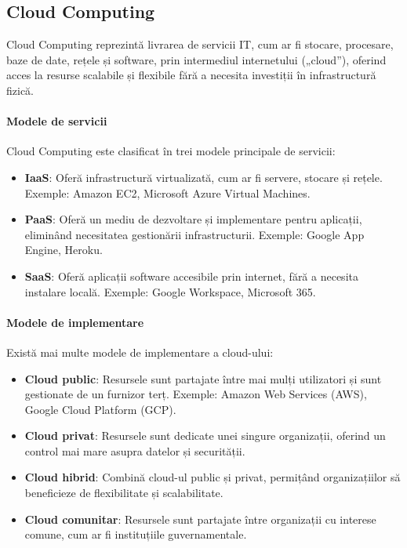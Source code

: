 \documentclass[titlepage,12pt]{article}
\begin{document}
\subsection{Cloud Computing}

Cloud Computing reprezintă livrarea de servicii IT, cum ar fi stocare, procesare, baze de date, rețele și software, prin intermediul internetului („cloud”), oferind acces la resurse scalabile și flexibile fără a necesita investiții în infrastructură fizică.

\paragraph{Modele de servicii}
Cloud Computing este clasificat în trei modele principale de servicii:
\begin{itemize}
    \item \textbf{\ac {IaaS}}: Oferă infrastructură virtualizată, cum ar fi servere, stocare și rețele. Exemple: Amazon EC2, Microsoft Azure Virtual Machines.
    \item \textbf{\ac {PaaS}}: Oferă un mediu de dezvoltare și implementare pentru aplicații, eliminând necesitatea gestionării infrastructurii. Exemple: Google App Engine, Heroku.
    \item \textbf{\ac {SaaS}}: Oferă aplicații software accesibile prin internet, fără a necesita instalare locală. Exemple: Google Workspace, Microsoft 365.
\end{itemize}

\paragraph{Modele de implementare}
Există mai multe modele de implementare a cloud-ului:
\begin{itemize}
    \item \textbf{Cloud public}: Resursele sunt partajate între mai mulți utilizatori și sunt gestionate de un furnizor terț. Exemple: Amazon Web Services (AWS), Google Cloud Platform (GCP).
    \item \textbf{Cloud privat}: Resursele sunt dedicate unei singure organizații, oferind un control mai mare asupra datelor și securității.
    \item \textbf{Cloud hibrid}: Combină cloud-ul public și privat, permițând organizațiilor să beneficieze de flexibilitate și scalabilitate.
    \item \textbf{Cloud comunitar}: Resursele sunt partajate între organizații cu interese comune, cum ar fi instituțiile guvernamentale.
\end{itemize}
\end{document}
